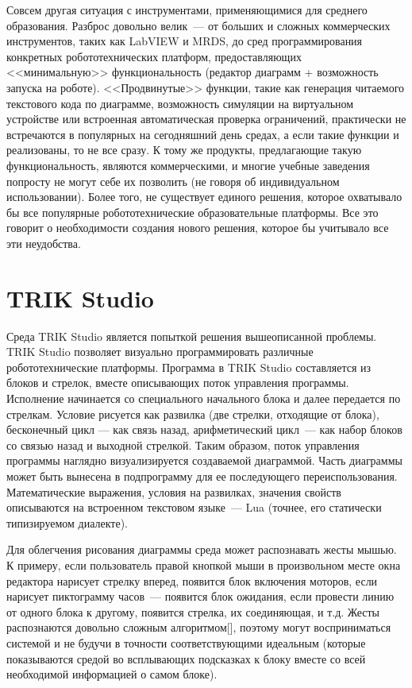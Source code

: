\documentclass[a5paper]{article}
\begin{document}
Совсем другая ситуация с инструментами, применяющимися для среднего образования. Разброс довольно велик~--- 
от больших и сложных коммерческих инструментов, таких как LabVIEW и MRDS, до сред программирования конкретных 
робототехнических платформ, предоставляющих <<минимальную>> функциональность (редактор диаграмм + 
возможность запуска на роботе). <<Продвинутые>> функции, такие как генерация читаемого текстового 
кода по диаграмме, возможность симуляции на виртуальном устройстве или встроенная автоматическая 
проверка ограничений, практически не встречаются в популярных на сегодняшний день средах, а если такие 
функции и реализованы, то не все сразу. К тому же продукты, предлагающие такую функциональность, являются 
коммерческими, и многие учебные заведения попросту не могут себе их позволить (не говоря об индивидуальном 
использовании). Более того, не существует единого решения, которое охватывало бы все популярные 
робототехнические образовательные платформы. Все это говорит о необходимости создания нового решения, 
которое бы учитывало все эти неудобства.

\section{TRIK Studio}

Среда TRIK Studio является попыткой решения вышеописанной проблемы. TRIK Studio позволяет визуально программировать 
различные робототехнические платформы. Программа в TRIK Studio составляется из блоков и стрелок, вместе описывающих 
поток управления программы. Исполнение начинается со специального начального блока и далее передается по стрелкам. 
Условие рисуется как развилка (две стрелки, отходящие от блока), бесконечный цикл --- как связь назад, арифметический 
цикл~--- как набор блоков со связью назад и выходной стрелкой. Таким образом, поток управления программы наглядно 
визуализируется создаваемой диаграммой. Часть диаграммы может быть вынесена в подпрограмму для ее последующего 
переиспользования. Математические выражения, условия на развилках, значения свойств описываются на встроенном 
текстовом языке~--- Lua (точнее, его статически типизируемом диалекте).

Для облегчения рисования диаграммы среда может распознавать жесты мышью. К примеру, если пользователь правой 
кнопкой мыши в произвольном месте окна редактора нарисует стрелку вперед, появится блок включения моторов, если 
нарисует пиктограмму часов~--- появится блок ожидания, если провести линию от одного блока к другому, появится 
стрелка, их соединяющая, и т.д. Жесты распознаются довольно сложным алгоритмом[], поэтому могут восприниматься 
системой и не будучи в точности соответствующими идеальным (которые показываются средой во всплывающих подсказках 
к блоку вместе со всей необходимой информацией о самом блоке).
\end{document}
